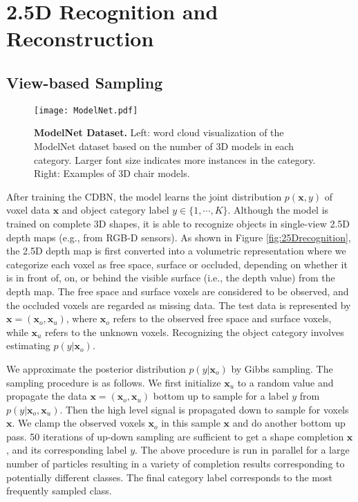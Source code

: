 \documentclass[10pt,twocolumn,letterpaper]{article}
\begin{document}
\section{2.5D Recognition and Reconstruction}



\subsection{View-based Sampling}


\begin{figure*}[t]
\vspace{-2mm}

\texttt{[image: ModelNet.pdf]}

\vspace{-2mm}
\caption{{\bf ModelNet Dataset.} Left: word cloud visualization of the ModelNet dataset based on the number of
3D models in each category. Larger font size indicates more instances in the category. Right: Examples of 3D chair models.}
\label{fig:modelnet}
\vspace{-3mm}
\end{figure*}




After training the CDBN, the model learns the joint distribution $p(\mathbf{x},y)$ of voxel data $\mathbf{x}$ and object category label $y \in \{ 1,\cdots,K\}$. 
Although the model is trained on complete 3D shapes,
it is able to recognize objects in single-view 2.5D depth maps (e.g., from RGB-D sensors).
As shown in Figure \ref{fig:25Drecognition},
the 2.5D depth map is first converted into a volumetric representation where we categorize each voxel as free space, surface or occluded,
depending on whether it is in front of, on, or behind the visible surface (i.e., the depth value) from the depth map.
The free space and surface voxels are considered to be observed, and the occluded voxels are regarded as missing data.
The test data is represented by $\mathbf{x}=(\mathbf{x}_o,\mathbf{x}_u)$, where $\mathbf{x}_o$ refers to the observed free space and surface voxels,
while $\mathbf{x}_u$ refers to the unknown voxels.
Recognizing the object category involves estimating $p(y|\mathbf{x}_o)$. 







We approximate the posterior distribution $p(y|\mathbf{x}_o)$ by Gibbs sampling. The sampling procedure is as follows. We first initialize $\mathbf{x}_u$ to a random value and propagate the data $\mathbf{x} = (\mathbf{x}_o,\mathbf{x}_u)$ bottom up to sample for a label $y$ from $p(y|\mathbf{x}_o, \mathbf{x}_u)$. Then the high level signal is propagated down to sample for voxels $\mathbf{x}$. We clamp the observed voxels $\mathbf{x}_o$ in this sample $\mathbf{x}$ and do another bottom up pass. 50 iterations of up-down sampling are sufficient to get a shape completion $\mathbf{x}$, and its corresponding label $y$. 
The above procedure is run in parallel for a large number of particles resulting in a variety of completion results corresponding to potentially different classes. The final category label corresponds to the most frequently sampled class.
\end{document}
